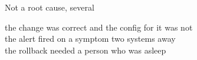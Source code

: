 
\begin{frame}{Not a root cause, several}
  \begin{console}
   the change was correct and the config for it was not\\
   the alert fired on a symptom two systems away\\
   the rollback needed a person who was asleep
  \end{console}
\end{frame}

